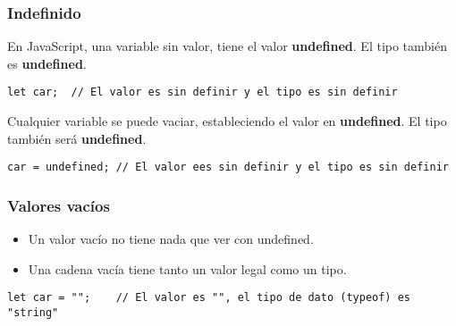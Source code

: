 \begin{frame}[fragile]
  \frametitle{Indefinido}

  En JavaScript, una variable sin valor, tiene el valor \textbf{undefined}.
  El tipo también es \textbf{undefined}.

  \vspace{\baselineskip}
  \begin{lstlisting}
let car;  // El valor es sin definir y el tipo es sin definir
  \end{lstlisting}

  \vspace{\baselineskip}
  Cualquier variable se puede vaciar, estableciendo el valor en
  \textbf{undefined}. El tipo también será \textbf{undefined}.

  \vspace{\baselineskip}
  \begin{lstlisting}
car = undefined; // El valor ees sin definir y el tipo es sin definir
  \end{lstlisting}

\end{frame}

\begin{frame}[fragile]
  \frametitle{Valores vacíos}

  \begin{itemize}
    \item Un valor vacío no tiene nada que ver con undefined.
    \item Una cadena vacía tiene tanto un valor legal como un tipo.
  \end{itemize}

  \vspace{\baselineskip}
  \begin{lstlisting}
let car = "";    // El valor es "", el tipo de dato (typeof) es "string"
  \end{lstlisting}
\end{frame}
